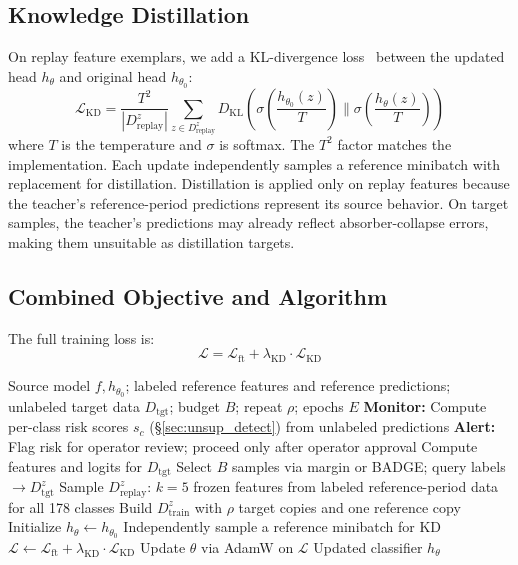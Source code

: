 \documentclass[journal]{IEEEtran}
\newcommand{\ours}{CARE}  %
\begin{document}
\subsection{Knowledge Distillation}
\label{sec:distill}

On replay feature exemplars, we add a KL-divergence loss~\cite{hinton2015distilling} between the updated head $h_\theta$ and original head $h_{\theta_0}$:
\begin{equation}
  \mathcal{L}_{\text{KD}} = \frac{T^2}{|D_{\text{replay}}^z|} \!\sum_{z \in D_{\text{replay}}^z} D_{\text{KL}}\!\!\left(\sigma\!\!\left(\frac{h_{\theta_0}(z)}{T}\right) \!\Big\|\! \sigma\!\!\left(\frac{h_\theta(z)}{T}\right)\!\right)
\end{equation}
where $T$ is the temperature and $\sigma$ is softmax. The $T^2$ factor matches the implementation. Each update independently samples a reference minibatch with replacement for distillation.
Distillation is applied only on replay features because the teacher's reference-period predictions represent its source behavior.
On target samples, the teacher's predictions may already reflect absorber-collapse errors, making them unsuitable as distillation targets.

\subsection{Combined Objective and Algorithm}

The full training loss is:
\begin{equation}
  \mathcal{L} = \mathcal{L}_{\text{ft}} + \lambda_{\text{KD}} \cdot \mathcal{L}_{\text{KD}}
\end{equation}

\begin{algorithm}[t]
\caption{\ours{}: Collapse-Aware Repair}
\label{alg:care}
\begin{algorithmic}[1]
\REQUIRE Source model $f, h_{\theta_0}$; labeled reference features and reference predictions; unlabeled target data $D_{\text{tgt}}$; budget $B$; repeat $\rho$; epochs $E$
\STATE \textbf{Monitor:} Compute per-class risk scores $s_c$ (\S\ref{sec:unsup_detect}) from unlabeled predictions
\STATE \textbf{Alert:} Flag risk for operator review; proceed only after operator approval
\STATE Compute features and logits for $D_{\text{tgt}}$
\STATE Select $B$ samples via margin or BADGE; query labels $\to D_{\text{tgt}}^z$
\STATE Sample $D_{\text{replay}}^z$: $k{=}5$ frozen features from labeled reference-period data for all 178 classes
\STATE Build $D_{\text{train}}^z$ with $\rho$ target copies and one reference copy
\STATE Initialize $h_\theta \leftarrow h_{\theta_0}$
    \STATE Independently sample a reference minibatch for KD
    \STATE $\mathcal{L} \leftarrow \mathcal{L}_{\text{ft}} + \lambda_{\text{KD}} \cdot \mathcal{L}_{\text{KD}}$
    \STATE Update $\theta$ via AdamW on $\mathcal{L}$
  \ENDFOR
\ENDFOR
\RETURN Updated classifier $h_\theta$
\end{algorithmic}
\end{algorithm}
\end{document}
